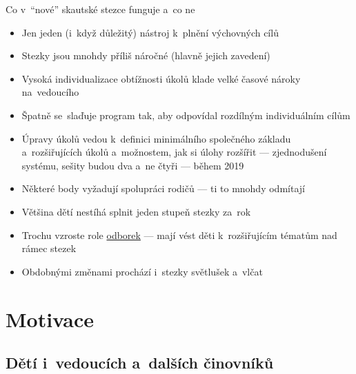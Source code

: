 \documentclass[compress, ucs, xelatex, 11pt, xcolor=dvipsnames, print,
	hyperref={
		bookmarks=true,
		unicode=true,
		colorlinks=true,
		pdftitle={Skautska vychovna metoda},
		plainpages=false,
		pdfauthor={Vojtech Zeisek},
		pdfsubject={Skautska vychovna metoda a jeji vyvoj za posledni stoleti a desetileti},
		pdfcreator={XeLaTeX},
		pdfkeywords={Junak, Pedagogika, Skaut, Skauting, Vychovna metoda},
		linkcolor=Black,
		anchorcolor=Black,
		citecolor=OliveGreen,
		filecolor=OliveGreen,
		menucolor=Black,
		urlcolor=OliveGreen,
		pdftex},
	url={hyphens, lowtilde} %
	]{beamer}
\begin{document}
\begin{frame}{Co v~\enquote{nové} skautské stezce funguje a~co ne}
	\begin{itemize}
		\item Jen jeden (i~když důležitý) nástroj k~plnění výchovných cílů
		\item Stezky jsou mnohdy příliš náročné (hlavně jejich zavedení)
		\item Vysoká individualizace obtížnosti úkolů klade velké časové nároky na~vedoucího
		\item Špatně se~slaďuje program tak, aby odpovídal rozdílným individuálním cílům
		\item Úpravy úkolů vedou k~definici minimálního společného základu a~rozšiřujících úkolů a~možnostem, jak si úlohy rozšířit --- zjednodušení systému, sešity budou dva a~ne čtyři --- během 2019
		\item Některé body vyžadují spolupráci rodičů --- ti to mnohdy odmítají
		\item Většina dětí nestíhá splnit jeden stupeň stezky za~rok
		\item Trochu vzroste role \href{https://odborky.skaut.cz/}{odborek} --- mají vést děti k~rozšiřujícím tématům nad rámec stezek
		\item Obdobnými změnami prochází i~stezky světlušek a~vlčat
	\end{itemize}
\end{frame}

\section{Motivace}

\subsection{Dětí i~vedoucích a~dalších činovníků}
\end{document}
